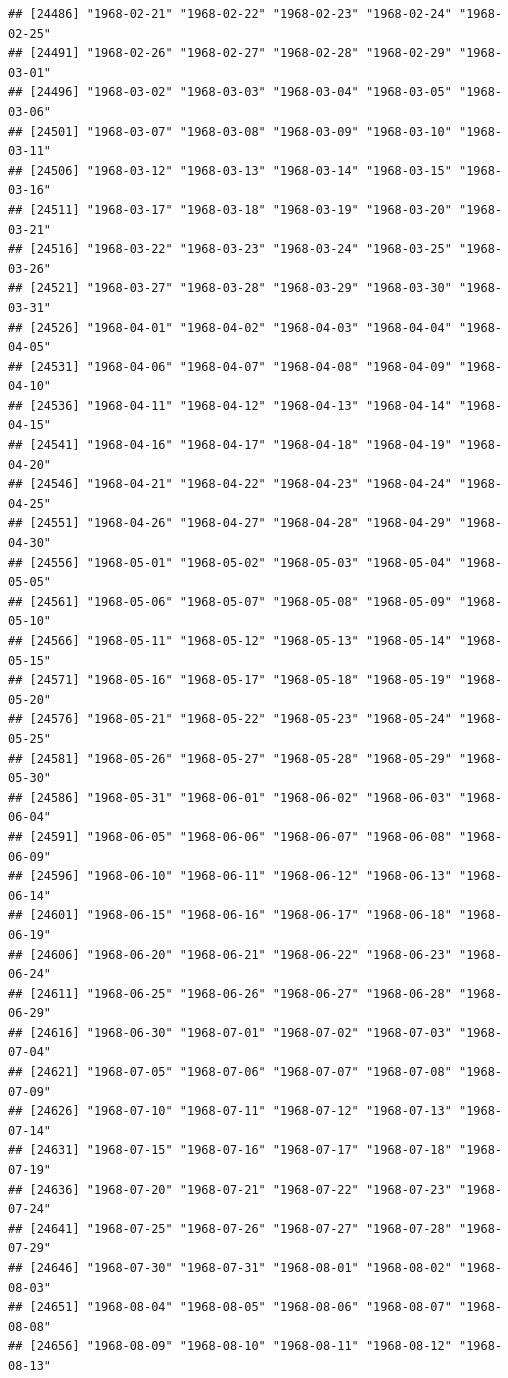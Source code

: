 \documentclass{article}\usepackage[]{graphicx}\usepackage[]{color}
\makeatletter
\newenvironment{kframe}{%
 \def\at@end@of@kframe{}%
 \ifinner\ifhmode%
  \def\at@end@of@kframe{\end{minipage}}%
  \begin{minipage}{\columnwidth}%
 \fi\fi%
 \def\FrameCommand##1{\hskip\@totalleftmargin \hskip-\fboxsep
 \colorbox{shadecolor}{##1}\hskip-\fboxsep
     \hskip-\linewidth \hskip-\@totalleftmargin \hskip\columnwidth}%
 \MakeFramed {\advance\hsize-\width
   \@totalleftmargin\z@ \linewidth\hsize
   \@setminipage}}%
 {\par\unskip\endMakeFramed%
 \at@end@of@kframe}
\newenvironment{knitrout}{}{} %
\makeatother
\begin{document}
\begin{description}
\begin{knitrout}
\begin{kframe}
\begin{verbatim}
## [24486] "1968-02-21" "1968-02-22" "1968-02-23" "1968-02-24" "1968-02-25"
## [24491] "1968-02-26" "1968-02-27" "1968-02-28" "1968-02-29" "1968-03-01"
## [24496] "1968-03-02" "1968-03-03" "1968-03-04" "1968-03-05" "1968-03-06"
## [24501] "1968-03-07" "1968-03-08" "1968-03-09" "1968-03-10" "1968-03-11"
## [24506] "1968-03-12" "1968-03-13" "1968-03-14" "1968-03-15" "1968-03-16"
## [24511] "1968-03-17" "1968-03-18" "1968-03-19" "1968-03-20" "1968-03-21"
## [24516] "1968-03-22" "1968-03-23" "1968-03-24" "1968-03-25" "1968-03-26"
## [24521] "1968-03-27" "1968-03-28" "1968-03-29" "1968-03-30" "1968-03-31"
## [24526] "1968-04-01" "1968-04-02" "1968-04-03" "1968-04-04" "1968-04-05"
## [24531] "1968-04-06" "1968-04-07" "1968-04-08" "1968-04-09" "1968-04-10"
## [24536] "1968-04-11" "1968-04-12" "1968-04-13" "1968-04-14" "1968-04-15"
## [24541] "1968-04-16" "1968-04-17" "1968-04-18" "1968-04-19" "1968-04-20"
## [24546] "1968-04-21" "1968-04-22" "1968-04-23" "1968-04-24" "1968-04-25"
## [24551] "1968-04-26" "1968-04-27" "1968-04-28" "1968-04-29" "1968-04-30"
## [24556] "1968-05-01" "1968-05-02" "1968-05-03" "1968-05-04" "1968-05-05"
## [24561] "1968-05-06" "1968-05-07" "1968-05-08" "1968-05-09" "1968-05-10"
## [24566] "1968-05-11" "1968-05-12" "1968-05-13" "1968-05-14" "1968-05-15"
## [24571] "1968-05-16" "1968-05-17" "1968-05-18" "1968-05-19" "1968-05-20"
## [24576] "1968-05-21" "1968-05-22" "1968-05-23" "1968-05-24" "1968-05-25"
## [24581] "1968-05-26" "1968-05-27" "1968-05-28" "1968-05-29" "1968-05-30"
## [24586] "1968-05-31" "1968-06-01" "1968-06-02" "1968-06-03" "1968-06-04"
## [24591] "1968-06-05" "1968-06-06" "1968-06-07" "1968-06-08" "1968-06-09"
## [24596] "1968-06-10" "1968-06-11" "1968-06-12" "1968-06-13" "1968-06-14"
## [24601] "1968-06-15" "1968-06-16" "1968-06-17" "1968-06-18" "1968-06-19"
## [24606] "1968-06-20" "1968-06-21" "1968-06-22" "1968-06-23" "1968-06-24"
## [24611] "1968-06-25" "1968-06-26" "1968-06-27" "1968-06-28" "1968-06-29"
## [24616] "1968-06-30" "1968-07-01" "1968-07-02" "1968-07-03" "1968-07-04"
## [24621] "1968-07-05" "1968-07-06" "1968-07-07" "1968-07-08" "1968-07-09"
## [24626] "1968-07-10" "1968-07-11" "1968-07-12" "1968-07-13" "1968-07-14"
## [24631] "1968-07-15" "1968-07-16" "1968-07-17" "1968-07-18" "1968-07-19"
## [24636] "1968-07-20" "1968-07-21" "1968-07-22" "1968-07-23" "1968-07-24"
## [24641] "1968-07-25" "1968-07-26" "1968-07-27" "1968-07-28" "1968-07-29"
## [24646] "1968-07-30" "1968-07-31" "1968-08-01" "1968-08-02" "1968-08-03"
## [24651] "1968-08-04" "1968-08-05" "1968-08-06" "1968-08-07" "1968-08-08"
## [24656] "1968-08-09" "1968-08-10" "1968-08-11" "1968-08-12" "1968-08-13"

\end{verbatim}
\end{kframe}
\end{knitrout}
\end{description}
\end{document}
